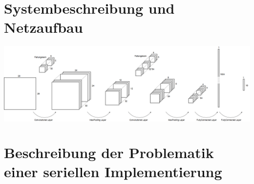 \documentclass[../main.tex]{subfiles}
\begin{document}
\section{Systembeschreibung und Netzaufbau}
\includegraphics[width=\textwidth]{../images/Benz/Aufbau_Netzwerk.png} %
\section{Beschreibung der Problematik einer seriellen Implementierung}
\end{document}
